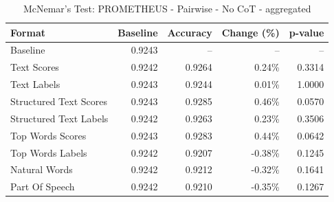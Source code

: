 \begin{table}[htbp]
\centering
\caption{McNemar's Test: PROMETHEUS - Pairwise - No CoT - aggregated}
\label{tab:prometheus-pairwise-no_chain_of_thought-aggregated}
\begin{tabular}{lrrrr}
\toprule
Format & Baseline & Accuracy & Change (\%) & p-value \\
\midrule
Baseline & 0.9243 & -- & -- & -- \\
Text Scores & 0.9242 & 0.9264 & 0.24\% & 0.3314 \\
Text Labels & 0.9243 & 0.9244 & 0.01\% & 1.0000 \\
Structured Text Scores & 0.9243 & 0.9285 & 0.46\% & 0.0570 \\
Structured Text Labels & 0.9242 & 0.9263 & 0.23\% & 0.3506 \\
Top Words Scores & 0.9243 & 0.9283 & 0.44\% & 0.0642 \\
Top Words Labels & 0.9242 & 0.9207 & -0.38\% & 0.1245 \\
Natural Words & 0.9242 & 0.9212 & -0.32\% & 0.1641 \\
Part Of Speech & 0.9242 & 0.9210 & -0.35\% & 0.1267 \\
\bottomrule
\end{tabular}
\end{table}
